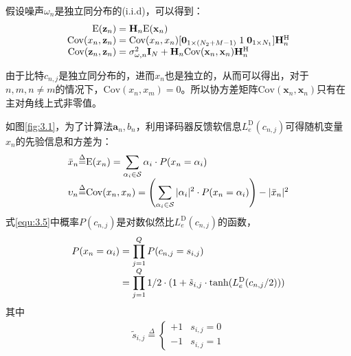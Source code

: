 假设噪声$\omega_n$是独立同分布的(i.i.d)，可以得到：
\begin{eqnarray}
    \begin{array}{r@{\;=\;}l}
        \mathrm{E}(\mathbf{z}_n)&\mathbf{H}_n\mathrm{E}(\mathbf{x}_n)\\
        \mathrm{Cov}(x_n,\mathbf{z}_n)&\mathrm{Cov}(x_n,x_n)[\mathbf{0}_{1\times(N_2+M-1)}\;1\;\mathbf{0}_{1\times
        N_1}]\mathbf{H}_n^{\mathrm{H}}\\
        \mathrm{Cov}(\mathbf{z}_n,\mathbf{z}_n)&\sigma_{\omega,n}^2\mathbf{I}_N+\mathbf{H}_n\mathrm{Cov}(\mathbf{x}_n,\mathbf{x}_n)\mathbf{H}_n^{\mathrm{H}}\\
    \end{array}
    \label{equ:3.6}
\end{eqnarray}

由于比特$c_{n,j}$是独立同分布的，进而$x_n$也是独立的，从而可以得出，对于$n,m,n\neq
m$的情况下，$\mathrm{Cov}(x_n,x_m)=0$。所以协方差矩阵$\mathrm{Cov}(\mathbf{x}_n,\mathbf{x}_n)$只有在主对角线上式非零值。

如图\ref{fig:3.1}，为了计算法$\mathbf{a}_n,b_n$，利用译码器反馈软信息$L_e^{\mathrm{D}}(c_{n,j})$可得随机变量$x_n$的先验信息和方差为：
\begin{eqnarray}
    \begin{array}{l@{\overset{\Delta}{=}}l}
        \bar{x}_n&\mathrm{E}(x_n)=\displaystyle\sum_{\alpha_i\in
        \mathcal{S}}\alpha_i\cdot P(x_n=\alpha_i)\\
        \upsilon_n&\mathrm{Cov}(x_n,x_n)=\left(\displaystyle\sum_{\alpha_i\in
        \mathcal{S}}|\alpha_i|^2\cdot P(x_n=\alpha_i)\right)-|\bar{x}_n|^2
    \end{array}
    \label{equ:3.7}
\end{eqnarray}
式\ref{equ:3.5}中概率$P(c_{n,j})$是对数似然比$L_e^{\mathrm{D}}(c_{n,j})$的函数，
\begin{eqnarray}
    \begin{array}{l@{\;=\;}l}
        \displaystyle
        P(x_n=\alpha_i)&\displaystyle\prod_{j=1}^{Q}P(c_{n,j}=s_{i,j})\\
        &\displaystyle\prod_{j=1}^Q1/2\cdot(1+\tilde{s}_{i,j}\cdot\tanh(L_e^{\mathrm{D}}(c_{n,j}/2)))
    \end{array}
    \label{equ:3.8}
\end{eqnarray}
其中
\begin{eqnarray}
    \tilde{s}_{i,j}\overset{\Delta}{=}
    \left\{
    \begin{matrix}
        +1&s_{i,j}=0\\
        -1&s_{i,j}=1
    \end{matrix}
    \right.
    \label{equ:3.9}
\end{eqnarray}

